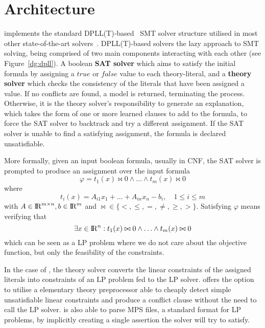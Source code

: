 \documentclass[runningheads]{llncs}
\begin{document}
\section{Architecture}

\dlinear implements the standard DPLL(T)-based~\cite{ref:dpll-t} SMT solver structure utilised in most other state-of-the-art solvers~\cite{ref:z3-dpll-t}.
DPLL(T)-based solvers the lazy approach to SMT solving, being comprised of two main components interacting with each other (see Figure~\ref{dg:dpll}).
A boolean \textbf{SAT solver} which aims to satisfy the initial formula by assigning a $true$ or $false$ value to each theory-literal, and a \textbf{theory solver} which checks the consistency of the literals that have been assigned a value.
If no conflicts are found, a model is returned, terminating the process.
Otherwise, it is the theory solver's responsibility to generate an explanation, which takes the form of one or more learned clauses to add to the formula, to force the SAT solver to backtrack and try a different assignment.
If the SAT solver is unable to find a satisfying assignment, the formula is declared unsatisfiable.

More formally, given an input boolean formula, usually in CNF, the SAT solver is prompted to produce an assignment over the input formula
\begin{equation} %
    \label{eq:smt-formula}
    \varphi = t_1(x) \bowtie 0 \wedge \ldots \wedge t_m (x) \bowtie 0
\end{equation}
where
\begin{equation*}
    t_i(x) = A_{i1}x_1 + \ldots + A_{in}x_n - b_i, \quad 1 \le i \le m
\end{equation*}
with $A \in {\rm I\!R}^{m \times n}, b \in {\rm I\!R}^m$ and $\bowtie \in \{<, \le, =, \ne, \ge, >\}$.
Satisfying $\varphi$ means verifying that
\begin{equation*}
    \exists x \in {\rm I\!R}^n : t_1(x) \bowtie 0 \wedge \ldots \wedge t_m(x) \bowtie 0
\end{equation*}
which can be seen as a LP problem where we do not care about the objective function, but only the feasibility of the constraints.

In the case of \dlinear, the theory solver converts the linear constraints of the assigned literals into constraints of an LP problem fed to the LP solver.
\dlinear offers the option to utilise a elementary theory preprocessor able to cheaply detect simple unsatisfiable linear constraints and produce a conflict clause without the need to call the LP solver.
\dlinear is also able to parse MPS files, a standard format for LP problems, by implicitly creating a single assertion the solver will try to satisfy.
\end{document}
